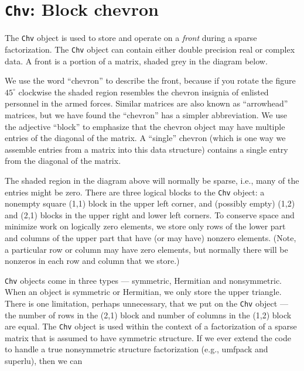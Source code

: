 \par
\chapter{{\tt Chv}: Block chevron}
\par
The {\tt Chv} object is used to store and operate on a {\it front}
during a sparse factorization.
The {\tt Chv} object can contain either double precision real or
complex data.
A front is a portion of a matrix, shaded grey in the diagram below.
\begin{center}
\end{center}
We use the word ``chevron'' to describe the front, because if you
rotate the figure $45^\circ$ clockwise the shaded region resembles
the chevron insignia of enlisted personnel in the armed forces.
Similar matrices are also known as ``arrowhead'' matrices, but we
have found the ``chevron'' has a simpler abbreviation.
We use the adjective ``block'' to emphasize that the chevron object
may have multiple entries of the diagonal of the matrix.
A ``single'' chevron (which is one way we assemble entries from a
matrix into this data structure) contains a single entry from the
diagonal of the matrix.
\par
The shaded region in the diagram above will normally be sparse,
i.e., many of the entries might be zero.
There are three logical blocks to the {\tt Chv} object:
a nonempty square (1,1) block in the upper left corner,
and (possibly empty) (1,2) and (2,1) blocks in the upper right
and lower left corners.
To conserve space and minimize work on logically zero elements,
we store only rows of the lower part and columns of the upper part
that have (or may have) nonzero elements. 
(Note, a particular row or column may 
have zero elements, but normally there will be nonzeros in each row
and column that we store.)
\par
{\tt Chv} objects come in three types --- symmetric, Hermitian and
nonsymmetric.
When an object is symmetric or Hermitian, we only store the upper
triangle.
There is one limitation, perhaps unnecessary,
that we put on the {\tt Chv} object ---
the number of rows in the (2,1) block and number of columns 
in the (1,2) block are equal.
The {\tt Chv} object is used within the context of a factorization
of a sparse matrix that is assumed to have symmetric structure.
If we ever extend the code to handle a true nonsymmetric structure
factorization (e.g., {\sc umfpack} and {\sc superlu}), then we can
